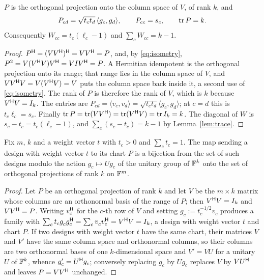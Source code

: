\begin{proposition}[Lean]\label{prop:chartid}
$P$ is the orthogonal projection onto the column space of $V$, of rank
$k$, and
\[
  P_{cd}=\sqrt{t_ct_d}\,\langle g_c,g_d\rangle,
  \qquad P_{cc}=s_c,\qquad \operatorname{tr} P=k .
\]
Consequently $W_{cc}=t_c(\ell_c-1)$ and $\sum_c W_{cc}=k-1$.
\end{proposition}

\begin{proof}
$P^{\mathsf{H}}=(VV^{\mathsf{H}})^{\mathsf{H}}=VV^{\mathsf{H}}=P$, and, by \eqref{eq:isometry},
$P^2=V(V^{\mathsf{H}} V)V^{\mathsf{H}}=VIV^{\mathsf{H}}=P$.  A Hermitian idempotent is the orthogonal
projection onto its range; that range lies in the column space of $V$, and
$VV^{\mathsf{H}} V=V(V^{\mathsf{H}} V)=V$ puts the column space back inside it, a second use
of \eqref{eq:isometry}.  The rank of $P$ is therefore the rank of $V$,
which is $k$ because $V^{\mathsf{H}} V=I_k$.  The entries are
$P_{cd}=\langle v_c,v_d\rangle=\sqrt{t_ct_d}\langle g_c,g_d\rangle$; at
$c=d$ this is $t_c\ell_c=s_c$.  Finally
$\operatorname{tr} P=\operatorname{tr}(VV^{\mathsf{H}})=\operatorname{tr}(V^{\mathsf{H}} V)=\operatorname{tr} I_k=k$.  The diagonal of $W$ is
$s_c-t_c=t_c(\ell_c-1)$, and $\sum_c(s_c-t_c)=k-1$ by
Lemma~\ref{lem:trace}.
\end{proof}

\begin{lemma}\label{lem:realize}
Fix $m$, $k$ and a weight vector $t$ with $t_c>0$ and $\sum_ct_c=1$.  The
map sending a design with weight vector $t$ to its chart $P$ is a
bijection from the set of such designs modulo the action
$g_c\mapsto Ug_c$ of the unitary group of $\mathbb{F}^k$ onto the set of
orthogonal projections of rank $k$ on $\mathbb{F}^m$.
\end{lemma}

\begin{proof}
Let $P$ be an orthogonal projection of rank $k$ and let $V$ be the
$m\times k$ matrix whose columns are an orthonormal basis of the range of
$P$; then $V^{\mathsf{H}} V=I_k$ and $VV^{\mathsf{H}}=P$.  Writing $v_c^{\mathsf{H}}$ for the $c$-th
row of $V$ and setting $g_c:=t_c^{-1/2}v_c$ produces a family with
$\sum_ct_cg_c^{\vphantom{\mathsf{H}}}g_c\adj=\sum_cv_c^{\vphantom{\mathsf{H}}}v_c\adj
=V\adj V=I_k$, a design with weight vector $t$ and chart $P$.  If two
designs with weight vector $t$ have the same chart, their matrices $V$
and $V'$ have the same column space and orthonormal columns, so their
columns are two orthonormal bases of one $k$-dimensional space and
$V'=VU$ for a unitary $U$ of $\mathbb{F}^k$, whence $g'_c=U^{\mathsf{H}} g_c$; conversely
replacing $g_c$ by $Ug_c$ replaces $V$ by $VU^{\mathsf{H}}$ and leaves
$P=VV^{\mathsf{H}}$ unchanged.
\end{proof}

